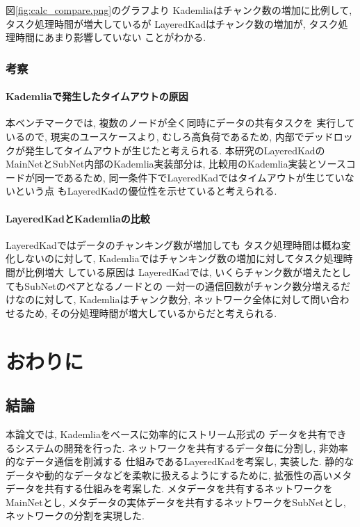 \documentclass[sotsuron]{jcsie}
\begin{document}
図\ref{fig:calc_compare.png}のグラフより
Kademliaはチャンク数の増加に比例して, タスク処理時間が増大しているが
LayeredKadはチャンク数の増加が, タスク処理時間にあまり影響していない
ことがわかる.

\subsection{考察}
\subsubsection{Kademliaで発生したタイムアウトの原因}
本ベンチマークでは, 複数のノードが全く同時にデータの共有タスクを
実行しているので, 現実のユースケースより, むしろ高負荷であるため, 
内部でデッドロックが発生してタイムアウトが生じたと考えられる.
本研究のLayeredKadのMainNetとSubNet内部のKademlia実装部分は, 
比較用のKademlia実装とソースコードが同一であるため, 
同一条件下でLayeredKadではタイムアウトが生じていないという点
もLayeredKadの優位性を示せていると考えられる.
\subsubsection{LayeredKadとKademliaの比較}
LayeredKadではデータのチャンキング数が増加しても
タスク処理時間は概ね変化しないのに対して, 
Kademliaではチャンキング数の増加に対してタスク処理時間が比例増大
している原因は
LayeredKadでは, いくらチャンク数が増えたとしてもSubNetのペアとなるノードとの
一対一の通信回数がチャンク数分増えるだけなのに対して, 
Kademliaはチャンク数分, ネットワーク全体に対して問い合わせるため, 
その分処理時間が増大しているからだと考えられる.


\chapter{おわりに}
\section{結論}
本論文では, Kademliaをベースに効率的にストリーム形式の
データを共有できるシステムの開発を行った.
ネットワークを共有するデータ毎に分割し, 非効率的なデータ通信を削減する
仕組みであるLayeredKadを考案し, 実装した.
静的なデータや動的なデータなどを柔軟に扱えるようにするために, 
拡張性の高いメタデータを共有する仕組みを考案した.
メタデータを共有するネットワークをMainNetとし, 
メタデータの実体データを共有するネットワークをSubNetとし, 
ネットワークの分割を実現した.
\end{document}
